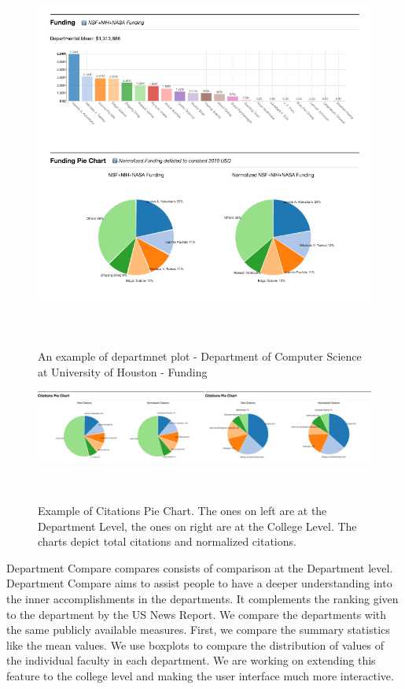 \begin{figure}
  \centering
  \includegraphics[width=1\textwidth]{figures/Dept-Fund}
  \caption{An example of departmnet plot - Department of Computer Science at University of Houston - Funding}~\label{fig:DP-College1}
\end{figure}





\begin{figure}
  \centering
  \includegraphics[width=1\textwidth]{figures/fig-Group-Citation}
  \caption{Example of Citations Pie Chart. The ones on left are at the Department Level, the ones on right are at the College Level. The charts depict total citations and normalized citations.}~\label{fig:Group-Cit}
\end{figure}





Department Compare compares consists of comparison at the Department level. Department Compare aims to assist people to have a deeper understanding into the inner accomplishments in the departments. It complements the ranking given to the department by the US News Report. We compare the departments with the same publicly available measures. First, we compare the summary statistics like the mean values. We use boxplots to compare the distribution of values of the individual faculty in each department. We are working on extending this feature to the college level and making the user interface much more interactive.

